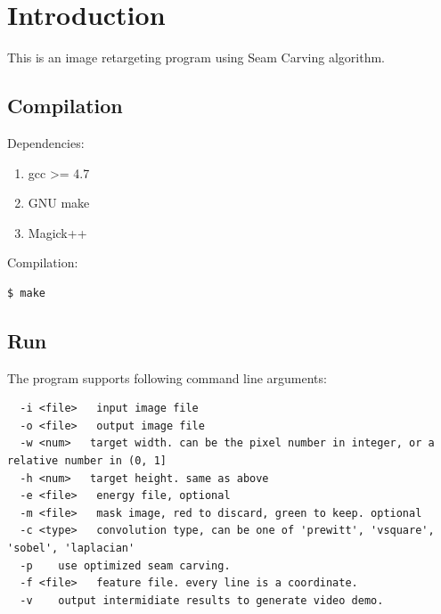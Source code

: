 \section{Introduction}
This is an image retargeting program using Seam Carving\cite{sc} algorithm.

\subsection{Compilation}
Dependencies:

\begin{enumerate}
    \item gcc >= 4.7
    \item GNU make
    \item Magick++
\end{enumerate}

Compilation:
\begin{lstlisting}
$ make
\end{lstlisting}

\subsection{Run}
The program supports following command line arguments:
\begin{lstlisting}
  -i <file>   input image file
  -o <file>   output image file
  -w <num>   target width. can be the pixel number in integer, or a relative number in (0, 1]
  -h <num>   target height. same as above
  -e <file>   energy file, optional
  -m <file>   mask image, red to discard, green to keep. optional
  -c <type>   convolution type, can be one of 'prewitt', 'vsquare', 'sobel', 'laplacian'
  -p    use optimized seam carving.
  -f <file>   feature file. every line is a coordinate.
  -v    output intermidiate results to generate video demo.
\end{lstlisting}

